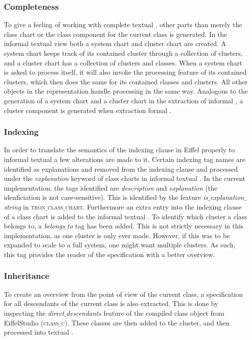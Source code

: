 \subsubsection{Completeness}
To give a feeling of working with complete textual \bon{}, other parts than merely the class chart or the class component for the current class is generated. In the informal textual \bon{ } view both a system chart and cluster chart are created. A system chart keeps track of its contained cluster through a collection of clusters, and a cluster chart has a collection of clusters and classes. When a system chart is asked to process itself, it will also invoke the processing feature of its contained clusters, which then does the same for its contained classes and clusters. All other objects in the \bon{} representation handle processing in the same way. Analogous to the generation of a system chart and a cluster chart in the extraction of informal \bon{}, a cluster component is generated when extraction formal \bon{}.

\subsubsection{Indexing}
In order to translate the semantics of the indexing clause in Eiffel properly to informal textual \bon{} a few alterations are made to it. Certain indexing tag names are identified as explanations and removed from the indexing clause and processed under the \textit{explanation} keyword of class charts in informal textual \bon{}. In the current implementation, the tags identified are \textit{description} and \textit{explanation} (the idenficiation is not case-sensitive). This is identified by the feature \textit{is$\_$explanation$\_$string} in \textsc{tbon$\_$class$\_$chart}. Furthermore an extra entry into the indexing clause of a class chart is added to the informal textual \bon{}. To identify which cluster a class belongs to, a \textit{belongs$\_$to} tag has been added. This is not strictly necessary in this implementation, as one cluster is only ever made. However, if this was to be expanded to scale to a full system, one might want multiple clusters. As such, this tag provides the reader of the specification with a better overview.

\subsubsection{Inheritance}
To create an overview from the point of view of the current class, a specification for all descendants of the current class is also extracted. This is done by inspecting the \textit{direct$\_$descendants} feature of the compiled class object from EiffelStudio (\textsc{class$\_$c}). These classes are then added to the cluster, and then processed into textual \bon{}.

